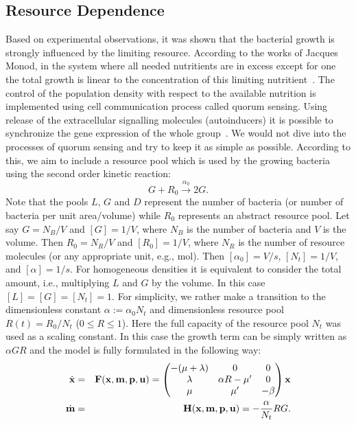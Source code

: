 \documentclass[10pt,A4paper]{article}
\begin{document}
\subsection{Resource Dependence}
Based on experimental observations, it was shown that the bacterial growth is strongly influenced by the limiting resource.
According to the works of Jacques Monod, in the system where all needed nutritients are in excess except for one the total growth is linear to the concentration of this limiting nutritient~\cite{monod_growth_1949}.
The control of the population density with respect to the available nutrition is implemented using cell communication process called quorum sensing.
Using release of the extracellular signalling molecules (autoinducers) it is possible to synchronize the gene expression of the whole group~\cite{ng_bacterial_2009}.
We would not dive into the processes of quorum sensing and try to keep it as simple as possible.
According to this, we aim to include a resource pool which is used by the growing bacteria using the second order kinetic reaction:
\begin{equation}
    G + R_0  \stackrel{\alpha_0}{\longrightarrow} 2G.
\end{equation}
Note that the pools $L$, $G$ and $D$ represent the number of bacteria (or number of bacteria per unit area/volume) while $R_0$ represents an abstract resource pool.
Let say $G=N_B/V$ and $[G]=1/V$, where $N_B$ is the number of bacteria and $V$ is the volume.
Then $R_0=N_R/V$ and $[R_0]=1/V$, where $N_R$ is the number of resource molecules (or any appropriate unit, e.g., mol).
Then $[\alpha_0]=V/s$, $[N_t]=1/V$, and $[\alpha]=1/s$.
For homogeneous densities it is equivalent to consider the total amount, i.e., multiplying $L$ and $G$ by the volume.
In this case $[L]=[G]=[N_t]=1$.
For simplicity, we rather make a transition to the dimensionless constant $\alpha:=\alpha_0 N_t$ and dimensionless resource pool $R(t) = R_0 / N_t$ ($0 \leqslant R \leqslant 1$).
Here the full capacity of the resource pool $N_t$ was used as a scaling constant.
In this case the growth term can be simply written as $\alpha G R$ and the model is fully formulated in the following way:
\begin{eqnarray}
    \dot {\mathbf{x}}  &=& \mathbf{F}(\mathbf{x}, \mathbf{m}, \mathbf{p}, \mathbf{u}) = \begin{pmatrix}
        -(\mu + \lambda) & 0               & 0      \\
        \lambda          & \alpha R - \mu' & 0      \\
        \mu              & \mu'            & -\beta 
    \end{pmatrix} \mathbf{x}\\
    \dot {\mathbf{m}} &=& \mathbf{H} (\mathbf{x}, \mathbf{m}, \mathbf{p}, \mathbf{u}) = -\frac{\alpha}{N_t} R G.
\end{eqnarray}
\end{document}
